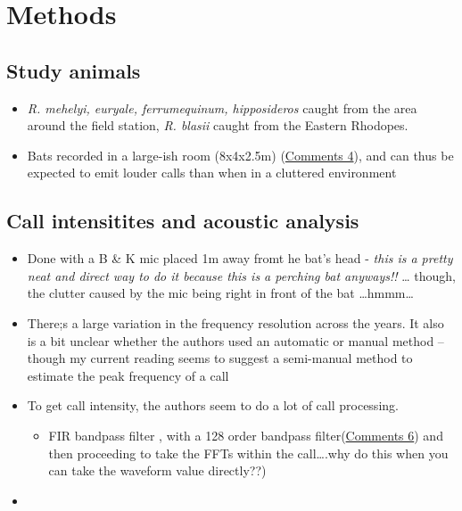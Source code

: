 \documentclass[
]{book}
\providecommand{\tightlist}{%
  \setlength{\itemsep}{0pt}\setlength{\parskip}{0pt}}
\begin{document}
\hypertarget{methods-7}{%
\section{Methods}\label{methods-7}}

\hypertarget{study-animals}{%
\subsection{Study animals}\label{study-animals}}

\begin{itemize}
\tightlist
\item
  \emph{R. mehelyi, euryale, ferrumequinum, hipposideros} caught from the area around the field station, \emph{R. blasii} caught from the Eastern Rhodopes.
\item
  Bats recorded in a large-ish room (8x4x2.5m) (\protect\hyperlink{com_shuchsiem}{Comments 4}), and can thus be expected to emit louder calls than when in a cluttered environment
\end{itemize}

\hypertarget{call-intensitites-and-acoustic-analysis}{%
\subsection{Call intensitites and acoustic analysis}\label{call-intensitites-and-acoustic-analysis}}

\begin{itemize}
\tightlist
\item
  Done with a B \& K mic placed 1m away fromt he bat's head - \emph{this is a pretty neat and direct way to do it because this is a perching bat anyways!!} \ldots{} though, the clutter caused by the mic being right in front of the bat \ldots hmmm\ldots{}
\item
  There;s a large variation in the frequency resolution across the years. It also is a bit unclear whether the authors used an automatic or manual method -- though my current reading seems to suggest a semi-manual method to estimate the peak frequency of a call
\item
  To get call intensity, the authors seem to do a lot of call processing.

  \begin{itemize}
  \tightlist
  \item
    FIR bandpass filter , with a 128 order bandpass filter(\protect\hyperlink{com_shuchsiem}{Comments 6}) and then proceeding to take the FFTs within the call\ldots.why do this when you can take the waveform value directly??)
  \end{itemize}
\item
\end{itemize}
\end{document}
